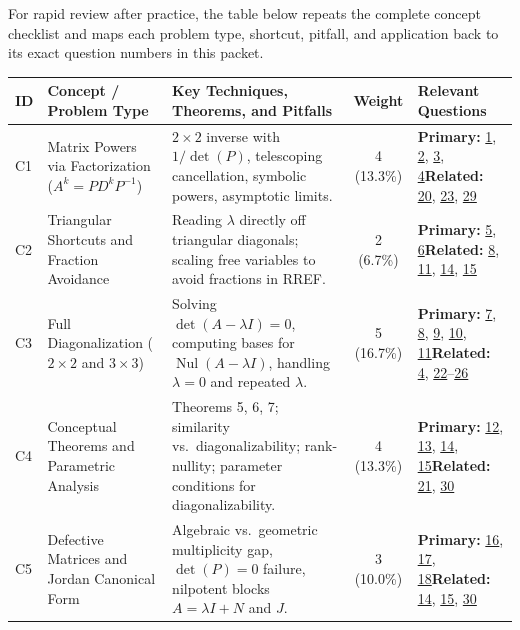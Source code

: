 \documentclass[11pt, letterpaper]{article}
\theoremstyle{definition}
\theoremstyle{remark}
\begin{document}
For rapid review after practice, the table below repeats the complete concept checklist and maps each problem type, shortcut, pitfall, and application back to its exact question numbers in this packet.

\renewcommand{\arraystretch}{1.5}
\begin{tabularx}{\textwidth}{l X X c p{3.1cm}}
\toprule
\textbf{ID} & \textbf{Concept / Problem Type} & \textbf{Key Techniques, Theorems, and Pitfalls} & \textbf{Weight} & \textbf{Relevant Questions} \\
\midrule
C1 & Matrix Powers via Factorization ($A^{k} = PD^{k}P^{-1}$) & $2 \times 2$ inverse with $1/\det(P)$, telescoping cancellation, symbolic powers, asymptotic limits. & 4 (13.3\%) & \textbf{Primary:} \hyperref[prob:1]{1}, \hyperref[prob:2]{2}, \hyperref[prob:3]{3}, \hyperref[prob:4]{4}\newline \textbf{Related:} \hyperref[prob:20]{20}, \hyperref[prob:23]{23}, \hyperref[prob:29]{29} \\
\addlinespace[3pt]
C2 & Triangular Shortcuts and Fraction Avoidance & Reading $\lambda$ directly off triangular diagonals; scaling free variables to avoid fractions in RREF. & 2 (6.7\%) & \textbf{Primary:} \hyperref[prob:5]{5}, \hyperref[prob:6]{6}\newline \textbf{Related:} \hyperref[prob:8]{8}, \hyperref[prob:11]{11}, \hyperref[prob:14]{14}, \hyperref[prob:15]{15} \\
\addlinespace[3pt]
C3 & Full Diagonalization ($2 \times 2$ and $3 \times 3$) & Solving $\det(A-\lambda I)=0$, computing bases for $\operatorname{Nul}(A-\lambda I)$, handling $\lambda = 0$ and repeated $\lambda$. & 5 (16.7\%) & \textbf{Primary:} \hyperref[prob:7]{7}, \hyperref[prob:8]{8}, \hyperref[prob:9]{9}, \hyperref[prob:10]{10}, \hyperref[prob:11]{11}\newline \textbf{Related:} \hyperref[prob:4]{4}, \hyperref[prob:22]{22}--\hyperref[prob:26]{26} \\
\addlinespace[3pt]
C4 & Conceptual Theorems and Parametric Analysis & Theorems 5, 6, 7; similarity vs.\ diagonalizability; rank-nullity; parameter conditions for diagonalizability. & 4 (13.3\%) & \textbf{Primary:} \hyperref[prob:12]{12}, \hyperref[prob:13]{13}, \hyperref[prob:14]{14}, \hyperref[prob:15]{15}\newline \textbf{Related:} \hyperref[prob:21]{21}, \hyperref[prob:30]{30} \\
\addlinespace[3pt]
C5 & Defective Matrices and Jordan Canonical Form & Algebraic vs.\ geometric multiplicity gap, $\det(P)=0$ failure, nilpotent blocks $A = \lambda I + N$ and $J$. & 3 (10.0\%) & \textbf{Primary:} \hyperref[prob:16]{16}, \hyperref[prob:17]{17}, \hyperref[prob:18]{18}\newline \textbf{Related:} \hyperref[prob:14]{14}, \hyperref[prob:15]{15}, \hyperref[prob:30]{30} \\

\end{tabularx}
\end{document}
